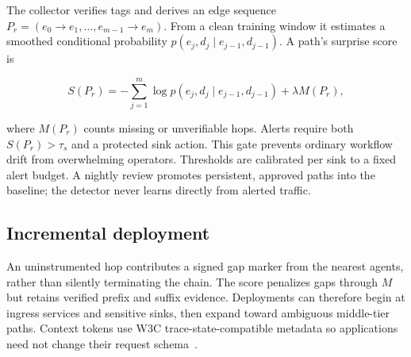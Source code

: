 The collector verifies tags and derives an edge sequence
$P_r=(e_0\!\rightarrow\!e_1,\ldots,e_{m-1}\!\rightarrow\!e_m)$.
From a clean training window it estimates a smoothed conditional probability
$p(e_j,d_j\mid e_{j-1},d_{j-1})$. A path's surprise score is

\begin{equation}
  S(P_r)=-\sum_{j=1}^{m}\log
  p(e_j,d_j\mid e_{j-1},d_{j-1}) + \lambda M(P_r),
  \label{eq:score}
\end{equation}

where $M(P_r)$ counts missing or unverifiable hops. Alerts require both
$S(P_r)>\tau_s$ and a protected sink action. This gate prevents ordinary
workflow drift from overwhelming operators. Thresholds are calibrated per sink
to a fixed alert budget. A nightly review promotes persistent, approved paths
into the baseline; the detector never learns directly from alerted traffic.

\subsection{Incremental deployment}

An uninstrumented hop contributes a signed gap marker from the nearest agents,
rather than silently terminating the chain. The score penalizes gaps through
$M$ but retains verified prefix and suffix evidence. Deployments can therefore
begin at ingress services and sensitive sinks, then expand toward ambiguous
middle-tier paths. Context tokens use W3C trace-state-compatible metadata so
applications need not change their request schema~\citep{w3ctracecontext}.

